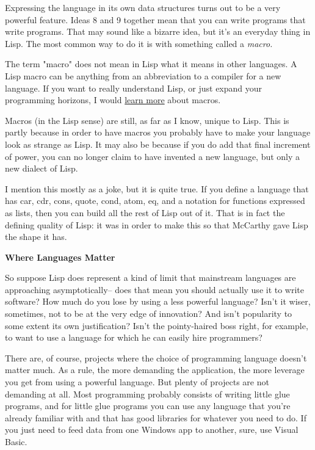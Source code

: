 Expressing the language
                  in its own data structures turns out to be a very powerful
                  feature. Ideas 8 and 9 together mean that you can write
                  programs that write programs. That may sound like a bizarre
                  idea, but it's an everyday thing in Lisp. The most common way
                  to do it is with something called a \emph{macro.}

The term "macro" does not mean in Lisp what it
                  means in other languages. A Lisp macro can be anything from an
                  abbreviation to a compiler for a new language. If you want to
                  really understand Lisp, or just expand your programming
                  horizons, I would \href{http://www.paulgraham.com/onlisp.html}{learn more} about
                  macros.

Macros (in the Lisp sense) are still, as
                  far as I know, unique to Lisp. This is partly because in order
                  to have macros you probably have to make your language look as
                  strange as Lisp. It may also be because if you do add that
                  final increment of power, you can no longer claim to have
                  invented a new language, but only a new dialect of Lisp.

I
                  mention this mostly as a joke, but it is quite true. If you
                  define a language that has car, cdr, cons, quote, cond, atom,
                  eq, and a notation for functions expressed as lists, then you
                  can build all the rest of Lisp out of it. That is in fact the
                  defining quality of Lisp: it was in order to make this so that
                  McCarthy gave Lisp the shape it has.

\textbf{Where Languages Matter}

So suppose Lisp does represent a kind of limit
                  that mainstream languages are approaching asymptotically--
                  does that mean you should actually use it to write software?
                  How much do you lose by using a less powerful language? Isn't
                  it wiser, sometimes, not to be at the very edge of innovation?
                  And isn't popularity to some extent its own justification?
                  Isn't the pointy-haired boss right, for example, to want to
                  use a language for which he can easily hire programmers?

There
                  are, of course, projects where the choice of programming
                  language doesn't matter much. As a rule, the more demanding
                  the application, the more leverage you get from using a
                  powerful language. But plenty of projects are not demanding at
                  all. Most programming probably consists of writing little glue
                  programs, and for little glue programs you can use any
                  language that you're already familiar with and that has good
                  libraries for whatever you need to do. If you just need to
                  feed data from one Windows app to another, sure, use Visual
                  Basic.

